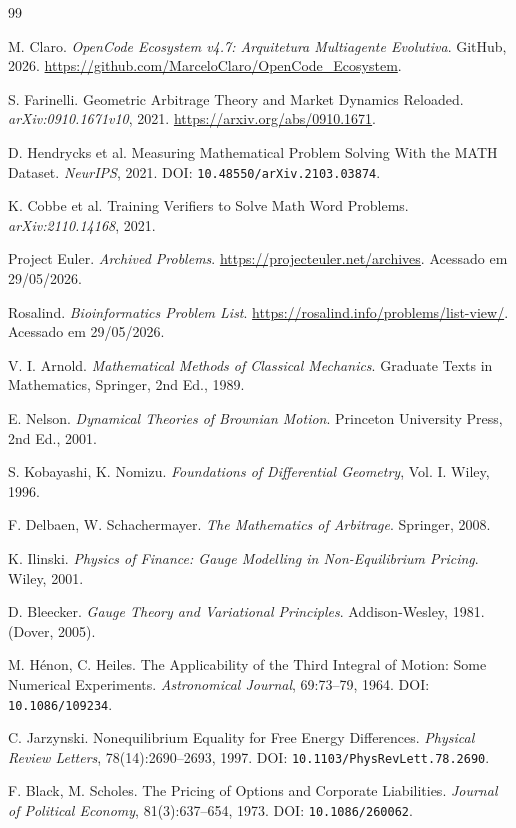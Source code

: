 \documentclass[12pt,a4paper]{article}
\begin{document}
\begin{thebibliography}{99}

M. Claro. \textit{OpenCode Ecosystem v4.7: Arquitetura Multiagente Evolutiva}.
GitHub, 2026. \url{https://github.com/MarceloClaro/OpenCode_Ecosystem}.

S. Farinelli. Geometric Arbitrage Theory and Market Dynamics Reloaded.
\textit{arXiv:0910.1671v10}, 2021. \url{https://arxiv.org/abs/0910.1671}.

D. Hendrycks et al. Measuring Mathematical Problem Solving With the MATH
Dataset. \textit{NeurIPS}, 2021. DOI: \texttt{10.48550/arXiv.2103.03874}.

K. Cobbe et al. Training Verifiers to Solve Math Word Problems.
\textit{arXiv:2110.14168}, 2021.

Project Euler. \textit{Archived Problems}. \url{https://projecteuler.net/archives}.
Acessado em 29/05/2026.

Rosalind. \textit{Bioinformatics Problem List}.
\url{https://rosalind.info/problems/list-view/}. Acessado em 29/05/2026.

V. I. Arnold. \textit{Mathematical Methods of Classical Mechanics}.
Graduate Texts in Mathematics, Springer, 2nd Ed., 1989.

E. Nelson. \textit{Dynamical Theories of Brownian Motion}.
Princeton University Press, 2nd Ed., 2001.

S. Kobayashi, K. Nomizu. \textit{Foundations of Differential Geometry},
Vol. I. Wiley, 1996.

F. Delbaen, W. Schachermayer. \textit{The Mathematics of Arbitrage}.
Springer, 2008.

K. Ilinski. \textit{Physics of Finance: Gauge Modelling in Non-Equilibrium
Pricing}. Wiley, 2001.

D. Bleecker. \textit{Gauge Theory and Variational Principles}.
Addison-Wesley, 1981. (Dover, 2005).

M. Hénon, C. Heiles. The Applicability of the Third Integral of Motion:
Some Numerical Experiments. \textit{Astronomical Journal}, 69:73--79, 1964.
DOI: \texttt{10.1086/109234}.

C. Jarzynski. Nonequilibrium Equality for Free Energy Differences.
\textit{Physical Review Letters}, 78(14):2690--2693, 1997.
DOI: \texttt{10.1103/PhysRevLett.78.2690}.

F. Black, M. Scholes. The Pricing of Options and Corporate Liabilities.
\textit{Journal of Political Economy}, 81(3):637--654, 1973.
DOI: \texttt{10.1086/260062}.

\end{thebibliography}
\end{document}

